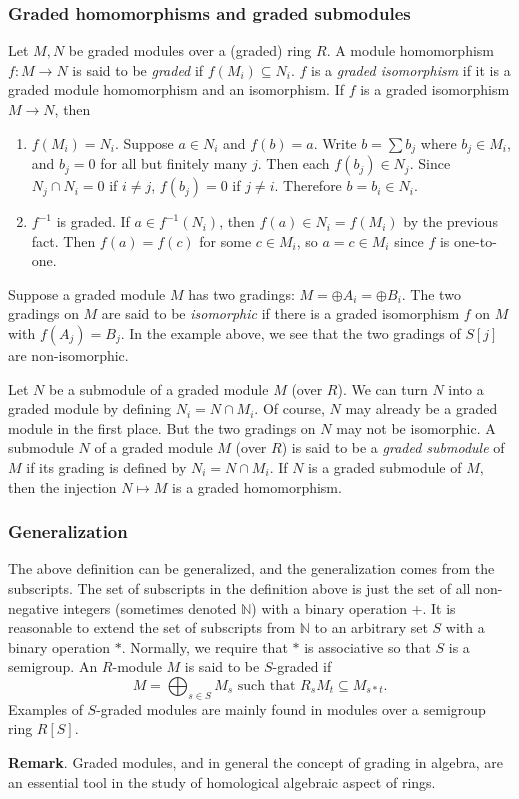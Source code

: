 \documentclass[12pt]{article}
\begin{document}
\subsubsection*{Graded homomorphisms and graded submodules}

Let $M,N$ be graded modules over a (graded) ring $R$.  A module homomorphism $f:M\to N$ is said to be \emph{graded} if $f(M_i)\subseteq N_i$.  $f$ is a \emph{graded isomorphism} if it is a graded module homomorphism and an isomorphism.  If $f$ is a graded isomorphism $M\to N$, then 
\begin{enumerate}
\item $f(M_i)=N_i$.  Suppose $a\in N_i$ and $f(b)=a$.  Write $b=\sum b_j$ where $b_j\in M_i$, and $b_j=0$ for all but finitely many $j$.  Then each $f(b_j)\in N_j$.  Since $N_j\cap N_i=0$ if $i\ne j$, $f(b_j)=0$ if $j\ne i$.  Therefore $b=b_i\in N_i$.
\item $f^{-1}$ is graded.  If $a\in f^{-1}(N_i)$, then $f(a)\in N_i=f(M_i)$ by the previous fact.  Then $f(a)=f(c)$ for some $c\in M_i$, so $a=c\in M_i$ since $f$ is one-to-one.
\end{enumerate}
Suppose a graded module $M$ has two gradings: $M=\oplus A_i=\oplus B_i$.  The two gradings on $M$ are said to be \emph{isomorphic} if there is a graded isomorphism $f$ on $M$ with $f(A_j)=B_j$.  In the example above, we see that the two gradings of $S[j]$ are non-isomorphic.

Let $N$ be a submodule of a graded module $M$ (over $R$).  We can turn $N$ into a graded module by defining $N_i=N\cap M_i$.  Of course, $N$ may already be a graded module in the first place.  But the two gradings on $N$ may not be isomorphic.  A submodule $N$ of a graded module $M$ (over $R$) is said to be a \emph{graded submodule} of $M$ if its grading is defined by $N_i=N\cap M_i$.  If $N$ is a graded submodule of $M$, then the injection $N\mapsto M$ is a graded homomorphism.

\subsubsection*{Generalization}

The above definition can be generalized, and the generalization comes from the subscripts.  The set of subscripts in the definition above is just the set of all non-negative integers (sometimes denoted $\mathbb{N}$) with a binary operation $+$.  It is reasonable to extend the set of subscripts from $\mathbb{N}$ to an arbitrary set $S$ with a binary operation $*$.  Normally, we require that $*$ is associative so that $S$ is a semigroup.  An $R$-module $M$ is said to be $S$-graded if $$M=\bigoplus_{s\in S}M_s\textrm{ such that }R_sM_t\subseteq M_{s*t}.$$
Examples of $S$-graded modules are mainly found in modules over a semigroup ring $R[S]$.

\textbf{Remark}.  Graded modules, and in general the concept of grading in algebra, are an essential tool in the study of homological algebraic aspect of rings.
\end{document}
